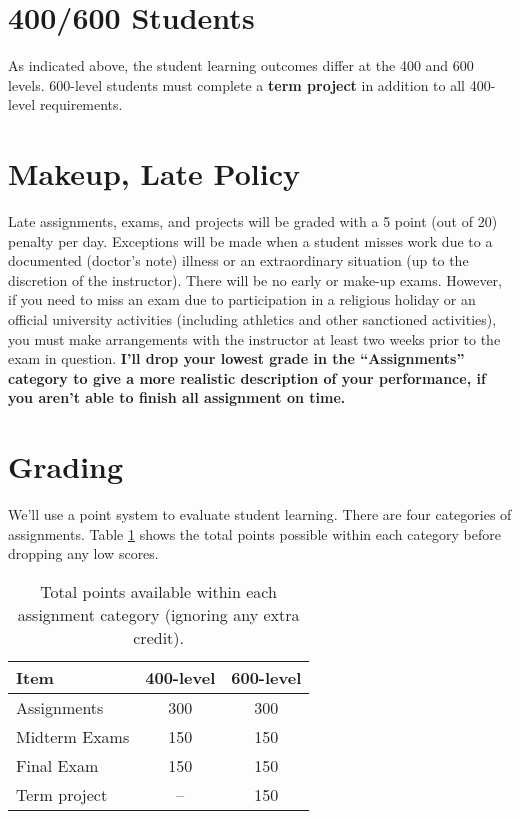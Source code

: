 \documentclass[11pt,onecolumn]{article}
\begin{document}
\section*{400/600 Students}
As indicated above, the student learning outcomes differ at the 400 and 600 levels. 600-level students must complete a \textbf{term project} in addition to all 400-level requirements.

\section*{Makeup, Late Policy}
Late assignments, exams, and projects will be graded with a 5 point (out of 20) penalty per day. Exceptions will be made when a student misses work due to a documented (doctor's note) illness or an extraordinary situation (up to the discretion of the instructor). There will be no early or make-up exams. However, if you need to miss an exam due to participation in a religious holiday or an official university activities (including athletics and other sanctioned activities), you must make arrangements with the instructor at least two weeks prior to the exam in question. \textbf{I'll drop your lowest grade in the ``Assignments'' category to give a more realistic description of your performance, if you aren't able to finish all assignment on time.}

\section*{Grading}

We'll use a point system to evaluate student learning. There are four categories of assignments. Table \ref{tab:points} shows the total points possible within each category before dropping any low scores.

\begin{table}[h]
  \begin{center}
  \begin{tabular}{l|c|c}	%
Item&400-level& 600-level\\\hline\hline
  Assignments& 300 & 300\\
  Midterm Exams& 150 & 150\\
  Final Exam& 150 & 150\\
  Term project &-- & 150 \\
  \end{tabular}
  \caption{Total points available within each assignment category (ignoring any extra credit). \label{tab:points}}
\end{center}

\end{table}
\end{document}

